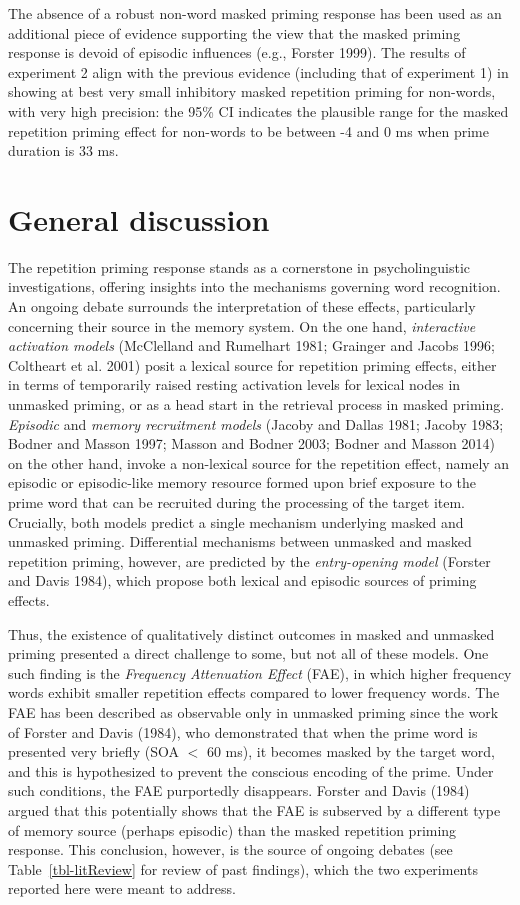 \documentclass[
]{interact}
\begin{document}
The absence of a robust non-word masked priming response has been used
as an additional piece of evidence supporting the view that the masked
priming response is devoid of episodic influences (e.g., Forster 1999).
The results of experiment 2 align with the previous evidence (including
that of experiment 1) in showing at best very small inhibitory masked
repetition priming for non-words, with very high precision: the 95\% CI
indicates the plausible range for the masked repetition priming effect
for non-words to be between -4 and 0 ms when prime duration is 33 ms.

\section{General discussion}\label{sec-discussion}

The repetition priming response stands as a cornerstone in
psycholinguistic investigations, offering insights into the mechanisms
governing word recognition. An ongoing debate surrounds the
interpretation of these effects, particularly concerning their source in
the memory system. On the one hand, \emph{interactive activation models}
(McClelland and Rumelhart 1981; Grainger and Jacobs 1996; Coltheart et
al. 2001) posit a lexical source for repetition priming effects, either
in terms of temporarily raised resting activation levels for lexical
nodes in unmasked priming, or as a head start in the retrieval process
in masked priming. \emph{Episodic} and \emph{memory recruitment models}
(Jacoby and Dallas 1981; Jacoby 1983; Bodner and Masson 1997; Masson and
Bodner 2003; Bodner and Masson 2014) on the other hand, invoke a
non-lexical source for the repetition effect, namely an episodic or
episodic-like memory resource formed upon brief exposure to the prime
word that can be recruited during the processing of the target item.
Crucially, both models predict a single mechanism underlying masked and
unmasked priming. Differential mechanisms between unmasked and masked
repetition priming, however, are predicted by the \emph{entry-opening
model} (Forster and Davis 1984), which propose both lexical and episodic
sources of priming effects.

Thus, the existence of qualitatively distinct outcomes in masked and
unmasked priming presented a direct challenge to some, but not all of
these models. One such finding is the \emph{Frequency Attenuation
Effect} (FAE), in which higher frequency words exhibit smaller
repetition effects compared to lower frequency words. The FAE has been
described as observable only in unmasked priming since the work of
Forster and Davis (1984), who demonstrated that when the prime word is
presented very briefly (SOA \(<\) 60 ms), it becomes masked by the
target word, and this is hypothesized to prevent the conscious encoding
of the prime. Under such conditions, the FAE purportedly disappears.
Forster and Davis (1984) argued that this potentially shows that the FAE
is subserved by a different type of memory source (perhaps episodic)
than the masked repetition priming response. This conclusion, however,
is the source of ongoing debates (see Table~\ref{tbl-litReview} for
review of past findings), which the two experiments reported here were
meant to address.
\end{document}
